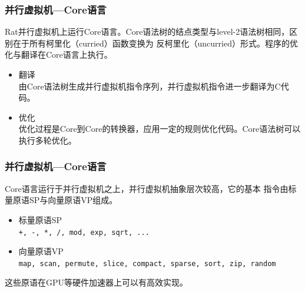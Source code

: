 \documentclass{beamer}
\begin{document}
\begin{frame}
  \frametitle{并行虚拟机---Core语言}
  Rat并行虚拟机上运行Core语言。Core语法树的结点类型与level-2语法树相同，区别在于所有柯里化（curried）函数变换为
  反柯里化（uncurried）形式。程序的优化与翻译在Core语言上执行。
  \begin{itemize}
    \item 翻译\\
      由Core语法树生成并行虚拟机指令序列，并行虚拟机指令进一步翻译为C代码。
    \item 优化\\
      优化过程是Core到Core的转换器，应用一定的规则优化代码。Core语法树可以执行多轮优化。
  \end{itemize}
\end{frame}


\begin{frame}
  \frametitle{并行虚拟机---Core语言}
  Core语言运行于并行虚拟机之上，并行虚拟机抽象层次较高，它的基本
  指令由标量原语SP与向量原语VP组成。
  \begin{itemize}
    \item 标量原语SP\\
      \texttt{+, -, *, /, mod, exp, sqrt, ...}
    \item 向量原语VP\\
      \texttt{map, scan, permute, slice, compact, sparse, sort, zip, random}
  \end{itemize}
  这些原语在GPU等硬件加速器上可以有高效实现。
\end{frame}
\end{document}
